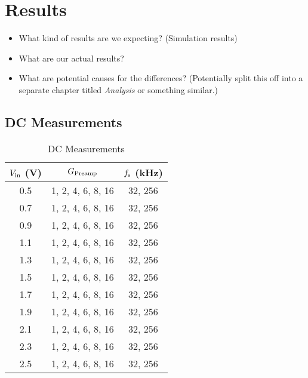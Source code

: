 \chapter{Results}
\label{ch:results}

\begin{itemize}\tightlist
    \item
        What kind of results are we expecting? (Simulation results)
    \item
        What are our actual results?
    \item
        What are potential causes for the differences? (Potentially split this off
        into a separate chapter titled \emph{Analysis} or something similar.)
\end{itemize}


\section{DC Measurements}
\label{sec:dcMeas}


\begin{table}
    \centering
    \selectfont
    \caption{DC Measurements}
    \label{tab:dcMeas}
    \begin{tabular}{ccc}
        \toprule
        {$V_{\textnormal{in}}$ (\si{\volt})} &
        {$G_{\textnormal{Preamp}}$}          &
        {$f_{\textnormal{s}}$ (\si{\kilo\hertz})}         \\
        \midrule
        0.5 & {1, 2, 4, 6, 8, 16} & {32, 256} \\
        0.7 & {1, 2, 4, 6, 8, 16} & {32, 256} \\
        0.9 & {1, 2, 4, 6, 8, 16} & {32, 256} \\
        1.1 & {1, 2, 4, 6, 8, 16} & {32, 256} \\
        1.3 & {1, 2, 4, 6, 8, 16} & {32, 256} \\
        1.5 & {1, 2, 4, 6, 8, 16} & {32, 256} \\
        1.7 & {1, 2, 4, 6, 8, 16} & {32, 256} \\
        1.9 & {1, 2, 4, 6, 8, 16} & {32, 256} \\
        2.1 & {1, 2, 4, 6, 8, 16} & {32, 256} \\
        2.3 & {1, 2, 4, 6, 8, 16} & {32, 256} \\
        2.5 & {1, 2, 4, 6, 8, 16} & {32, 256} \\
        \bottomrule
    \end{tabular}
\end{table}
